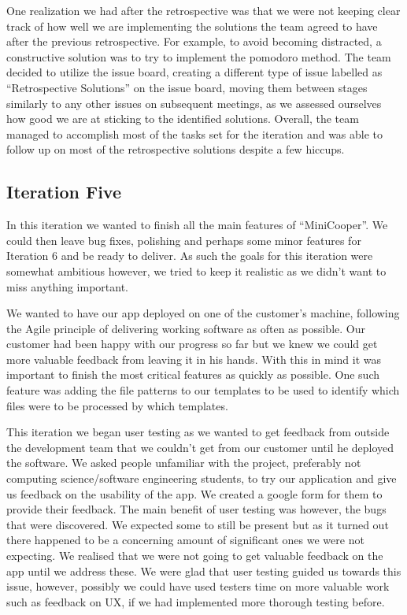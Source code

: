 \documentclass{l3proj}
\begin{document}
One realization we had after the retrospective was that we were not keeping clear track of how well we are implementing the solutions the team agreed to have after the previous retrospective. For example, to avoid becoming distracted, a constructive solution was to try to implement the pomodoro method. The team decided to utilize the issue board, creating a different type of issue labelled as “Retrospective Solutions” on the issue board, moving them between stages similarly to any other issues on subsequent meetings, as we assessed ourselves how good we are at sticking to the identified solutions. Overall, the team managed to accomplish most of the tasks set for the iteration and was able to follow up on most of the retrospective solutions despite a few hiccups.


\subsection{Iteration Five}

In this iteration we wanted to finish all the main features of ``MiniCooper''. We could then leave bug fixes, polishing and perhaps some minor features for Iteration 6 and be ready to deliver. As such the goals for this iteration were somewhat ambitious however, we tried to keep it realistic as we didn’t want to miss anything important. 

We wanted to have our app deployed on one of the customer’s machine, following the Agile principle of delivering working software as often as possible. Our customer had been happy with our progress so far but we knew we could get more valuable feedback from leaving it in his hands. With this in mind it was important to finish the most critical features as quickly as possible. One such feature was adding the file patterns to our templates to be used to identify which files were to be processed by which templates. 

This iteration we began user testing as we wanted to get feedback from outside the development team that we couldn’t get from our customer until he deployed the software. We asked people unfamiliar with the project, preferably not computing science/software engineering students, to try our application and give us feedback on the usability of the app. We created a google form for them to provide their feedback. The main benefit of user testing was however, the bugs that were discovered. We expected some to still be present but as it turned out there happened to be a concerning amount of significant ones we were not expecting. We realised that  we were not going to get valuable feedback on the app until we address these. 
We were glad that user testing guided us towards this issue, however, possibly we could have used testers time on more valuable work such as feedback on UX, if we had implemented more thorough testing before.
\end{document}
